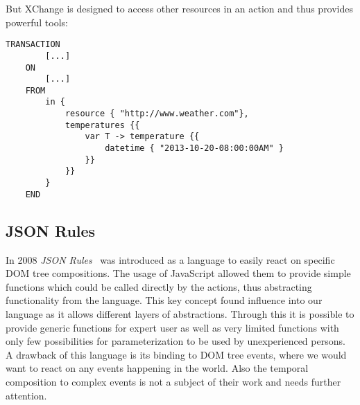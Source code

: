 But XChange is designed to access other resources in an action and thus provides powerful tools:

\begin{lstlisting}[frame=single,float=h,label=lstxchange2,language=XChange,caption=XChange Rule accesses remote resource]
	TRANSACTION
		[...]
	ON
		[...]
	FROM
		in {
			resource { "http://www.weather.com"},
			temperatures {{
				var T -> temperature {{
					datetime { "2013-10-20-08:00:00AM" }
				}}
			}}
		}
	END
\end{lstlisting}

\subsection{JSON Rules}
In 2008 \emph{JSON Rules}~\cite{2008-Giurca_Pascalau-JSON_Rules.pdf} was introduced as a language to easily react on specific DOM tree compositions.
The usage of JavaScript allowed them to provide simple functions which could be called directly by the actions, thus abstracting functionality from the language.
This key concept found influence into our language as it allows different layers of abstractions.
Through this it is possible to provide generic functions for expert user as well as very limited functions with only few possibilities for parameterization to be used by unexperienced persons.
A drawback of this language is its binding to DOM tree events, where we would want to react on any events happening in the world.
Also the temporal composition to complex events is not a subject of their work and needs further attention.


